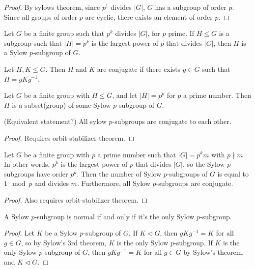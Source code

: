 \begin{proof}
	By sylows theorem, since $p^1$ divides $\left| G \right| $, $G$ has a subgroup of order $p$. Since all groups of order $p$ are cyclic, there exists an element of order $p$.
\end{proof}
\begin{definition}\label{dfn:S}
	Let $G$ be a finite group such that $p ^k$ divides $\left| G \right| $, for $p$ prime. If $H\leq G$ is a subgroup such that $\left| H \right| =p^k$ is the largest power of $p$ that divides $\left| G \right| $, then $H$ is a Sylow $p$-subgroup of $G$.
\end{definition}
\begin{definition}\label{dfn:j}
	Let $H,K\leq G$. Then $H$ and $K$ are conjugate if there exists $g\in G$ such that $H=gKg^{-1}$.
\end{definition}
\begin{theorem}\label{thm:S2}
	Let $G$ be a finite group with $H\leq G$, and let $\left| H \right| =p^k$ for $p$ a prime number. Then $H$ is a subset(group) of some Sylow $p$-subgroup of $G$.

	(Equivalent statement?) All sylow $p$-subgroups are conjugate to each other.
\end{theorem}
\begin{proof}
	Requires orbit-stabilizer theorem.
\end{proof}
\begin{theorem}\label{thm:S3}
	Let $G$ be a finite group with $p$ a prime number such that $\left| G \right| =p^km$ with $p\nmid m$. In other words, $p^k$ is the largest power of $p$ that divides $\left| G \right| $, so the Sylow $p$-subgroups have order $p^k$. Then the number of Sylow $p$-subgroups of $G$ is equal to $1\mod{p}$ and divides $m$. Furthermore, all Sylow $p$-subgroups are conjugate.
\end{theorem}
\begin{proof}
	Also requires orbit-stabilizer theorem.
\end{proof}
\begin{corollary}
	A Sylow $p$-subgroup is normal if and only if it's the only Sylow $p$-subgroup.
\end{corollary}
\begin{proof}
	Let $K$ be a Sylow $p$-subgroup of $G$. If $K\triangleleft G$, then $gKg^{-1}=K$ for all $g\in G$, so by Sylow's 3rd theorem, $K$ is the only Sylow $p$-subgroup. If $K$ is the only Sylow $p$-subgroup of $G$, then $gKg^{-1}=K$ for all $g\in G$ by Sylow's theorem, and $K\triangleleft G$.
\end{proof}
